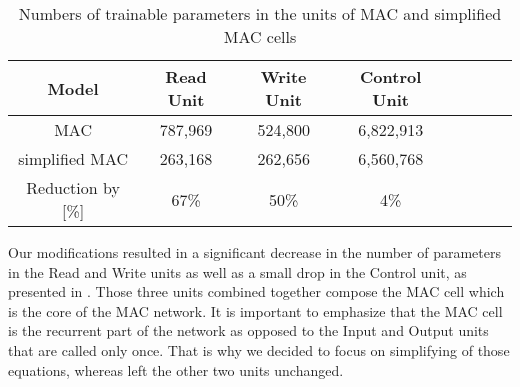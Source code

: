 \begin{table}
	\centering
	\begin{tabular}{ccccCcCc}
		\toprule
	     Model        & Read Unit               & Write Unit &  Control Unit         \\
		\midrule
		MAC   &  787,969 &  524,800        &    6,822,913    \\
	    simplified MAC & 263,168  & 262,656       &    6,560,768 \\
	    \midrule
	     Reduction by [\%]  & 67\%  &   50\%       &      4\%  \\
		\bottomrule
	\end{tabular}
	\caption{Numbers of trainable parameters in the units of MAC and simplified MAC cells}
	\label{tab:parameters}
\end{table}

Our modifications resulted in a significant decrease in the number of parameters in the Read and Write units as well as a small drop in the Control unit, as presented in . Those three units combined together compose the MAC cell which is the core of the MAC network. It is important to emphasize that the MAC cell is the recurrent part of the network as opposed to the Input and Output units that are called only once. That is why we decided to focus on simplifying of those equations, whereas left the other two units unchanged.